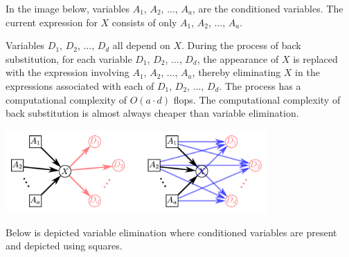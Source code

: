 \documentclass{article}
\begin{document}
In the image below, variables \(A_1\), \(A_2\), ..., \(A_a\), are the conditioned variables. The current expression for \(X\) consists of only \(A_1\), \(A_2\), ..., \(A_a\). 

Variables \(D_1\), \(D_2\), ..., \(D_d\) all depend on \(X\). During the process of back substitution, for each variable \(D_1\), \(D_2\), ..., \(D_d\), the appearance of \(X\) is replaced with the expression involving \(A_1\), \(A_2\), ..., \(A_a\), thereby eliminating \(X\) in the expressions associated with each of \(D_1\), \(D_2\), ..., \(D_d\). The process has a computational complexity of \(O(a \cdot d)\) flops. The computational complexity of back substitution is almost always cheaper than variable elimination.  

\begin{center} 
\includegraphics[width = 0.75\textwidth]{variable_mesh_back_substitution}
\end{center}

Below is depicted variable elimination where conditioned variables are present and depicted using squares. 
\end{document}
